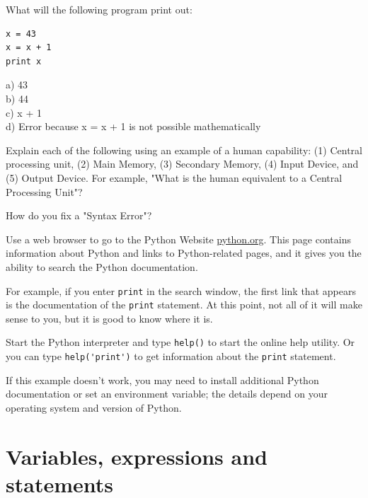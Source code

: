 \documentclass[10pt]{book}
\begin{document}
\begin{ex}
What will the following program print out:

\beforeverb
\begin{verbatim}
x = 43
x = x + 1
print x
\end{verbatim}
\afterverb
%
a) 43\\
b) 44\\
c) x + 1\\
d) Error because x = x + 1 is not possible mathematically
\end{ex}

\begin{ex}
Explain each of the following using an example of a human capability: 
(1) Central processing unit, (2) Main Memory, (3) Secondary Memory, 
(4) Input Device, and
(5) Output Device.
For example, "What is the human equivalent to a Central Processing Unit"? 
\end{ex}

\begin{ex}
How do you fix a "Syntax Error"?
\end{ex}

\begin{ex}
Use a web browser to go to the Python Website \url{python.org}.
This page contains information about Python and links
to Python-related pages, and it gives you the ability to search
the Python documentation.

For example, if you enter {\tt print} in the search window, the
first link that appears is the documentation of the {\tt print}
statement.  At this point, not all of it will make sense to you,
but it is good to know where it is.

\end{ex}


\begin{ex}
Start the Python interpreter and type {\tt help()} to start the online
help utility.  Or you can type \verb"help('print')" to get information
about the {\tt print} statement.

If this example doesn't work, you
may need to install additional Python documentation or set an
environment variable; the details depend on your operating system and
version of Python.

\end{ex}




\chapter{Variables, expressions and statements}
\end{document}
